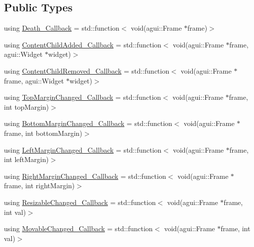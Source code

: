 \subsection*{Public Types}
\begin{DoxyCompactItemize}
\item 
using \mbox{\hyperlink{classec_1_1_generic_frame_listener_ac879048f08e2089e7cc5ae954fc2aad9}{Death\+\_\+\+Callback}} = std\+::function$<$ void(agui\+::\+Frame $\ast$frame)$>$
\item 
using \mbox{\hyperlink{classec_1_1_generic_frame_listener_a60609130cab4035d4dd9315cca67e7e9}{Content\+Child\+Added\+\_\+\+Callback}} = std\+::function$<$ void(agui\+::\+Frame $\ast$frame, agui\+::\+Widget $\ast$widget)$>$
\item 
using \mbox{\hyperlink{classec_1_1_generic_frame_listener_afe73c15b94012dd918638ee8fa11a67e}{Content\+Child\+Removed\+\_\+\+Callback}} = std\+::function$<$ void(agui\+::\+Frame $\ast$frame, agui\+::\+Widget $\ast$widget)$>$
\item 
using \mbox{\hyperlink{classec_1_1_generic_frame_listener_a67f7b45b927d5bbdf39a7e0ce1da0cf5}{Top\+Margin\+Changed\+\_\+\+Callback}} = std\+::function$<$ void(agui\+::\+Frame $\ast$frame, int top\+Margin)$>$
\item 
using \mbox{\hyperlink{classec_1_1_generic_frame_listener_aadeca32c32883e7951bd27b6a9a9d06a}{Bottom\+Margin\+Changed\+\_\+\+Callback}} = std\+::function$<$ void(agui\+::\+Frame $\ast$frame, int bottom\+Margin)$>$
\item 
using \mbox{\hyperlink{classec_1_1_generic_frame_listener_aca4694f1cf253669d8cd51045de4be46}{Left\+Margin\+Changed\+\_\+\+Callback}} = std\+::function$<$ void(agui\+::\+Frame $\ast$frame, int left\+Margin)$>$
\item 
using \mbox{\hyperlink{classec_1_1_generic_frame_listener_a6df716c696c9f2d91a4ff152026c5493}{Right\+Margin\+Changed\+\_\+\+Callback}} = std\+::function$<$ void(agui\+::\+Frame $\ast$frame, int right\+Margin)$>$
\item 
using \mbox{\hyperlink{classec_1_1_generic_frame_listener_a726ee9bf39ca67b4fe60a1a0cc038058}{Resizable\+Changed\+\_\+\+Callback}} = std\+::function$<$ void(agui\+::\+Frame $\ast$frame, int val)$>$
\item 
using \mbox{\hyperlink{classec_1_1_generic_frame_listener_a4ed5abe7907c3c2e367e8a6f1a2b01ac}{Movable\+Changed\+\_\+\+Callback}} = std\+::function$<$ void(agui\+::\+Frame $\ast$frame, int val)$>$
\end{DoxyCompactItemize}
